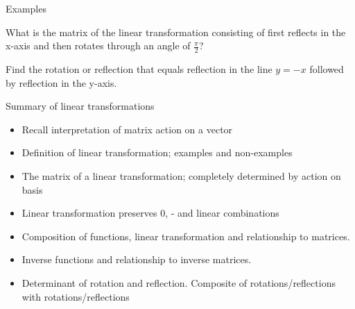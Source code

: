 \documentclass{beamer}
\begin{document}
\begin{frame}{Examples}
\begin{example}
What is the matrix of the linear transformation consisting of first reflects in the x-axis and then rotates through an angle of $\frac{\pi}{2}$?
\end{example}
\begin{example}
Find the rotation or reflection that equals reflection in the line $y = -x$ followed by reflection in the y-axis.
\end{example}
\end{frame}

\begin{frame}{Summary of linear transformations}
\begin{itemize}
	\item Recall interpretation of matrix action on a vector
	\item Definition of linear transformation; examples and non-examples
	\item The matrix of a linear transformation; completely determined by action on basis
	\item Linear transformation preserves 0, - and linear combinations
	\item Composition of functions, linear transformation and relationship to matrices.
	\item Inverse functions and relationship to inverse matrices.
	\item Determinant of rotation and reflection. Composite of rotations/reflections with rotations/reflections
\end{itemize}
\end{frame}
\end{document}
